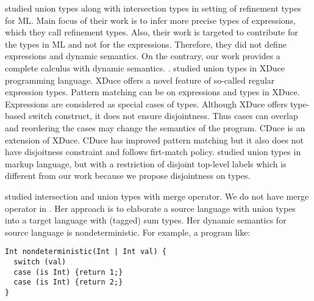 \citet{freeman1991refinement} studied union types along with intersection types
in setting of refinement types for ML. Main focus of their work is to infer
more precise types of expressions, which they call
refinement types. Also, their work is targeted to contribute for the types
in ML and not for the expressions. Therefore, they did not define
expressions and dynamic semantics. On the contrary, our work provides
a complete calculus with dynamic semantics.
.
\citet{hosoya2003xduce} studied union types
in XDuce programming language. XDuce offers a novel feature of
so-called regular expression types. Pattern matching can be on
expressions and types in XDuce.  Expressions are considered as special
cases of types. Although XDuce offers type-based switch construct,
it does not ensure disjointness. Thus cases can overlap and
reordering the cases may change the semantics of the program. CDuce
\cite{benzaken2003cduce} is an extension of XDuce. CDuce has improved
pattern matching but it also does not have disjoitness constraint and
follows firt-match policy.  \citet{fallside2001xml} studied union
types in markup language, but with a restriction of disjoint top-level
labels which is different from our work because we propose
disjointness on types.

\citet{dunfield2014elaborating} studied intersection and union
types with merge operator.
We do not have merge operator in \cal.
Her approach is to elaborate a source language with union types into a
target language with (tagged) sum types.
Her dynamic semantics for source language is nondeterministic.
For example, a program like:

\begin{lstlisting}[xleftmargin=.2\textwidth, xrightmargin=.2\textwidth]
Int nondeterministic(Int | Int val) {
  switch (val)
  case (is Int) {return 1;}
  case (is Int) {return 2;} 
}
\end{lstlisting}

